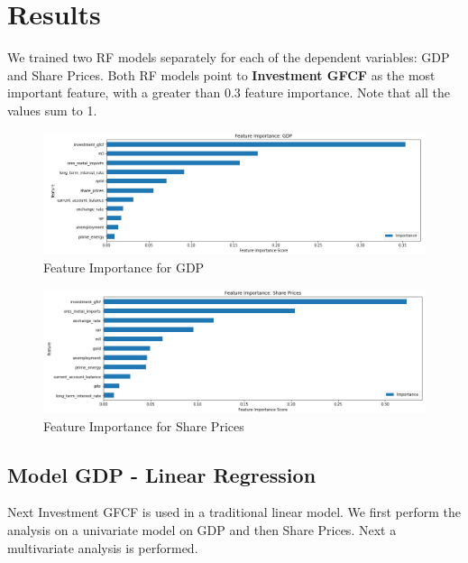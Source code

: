 \documentclass{elsarticle}
\begin{document}

\section{Results}
We trained two RF models separately for each of the dependent variables: GDP and Share Prices. Both RF models point to \textbf{Investment GFCF} as the most important feature, with a greater than 0.3 feature importance. Note that all the values sum to 1.

\begin{figure}[!h]
    \centering
    \includegraphics[width=1\textwidth]{images/rf_gdp.png}
    \caption{Feature Importance for GDP}
    \label{fig:Feature Importance for GDP}
\end{figure}

\begin{figure}[!h]
    \centering
    \includegraphics[width=1\textwidth]{images/rf_shares.png}
    \caption{Feature Importance for Share Prices}
    \label{fig:Feature Importance for Share Prices}
\end{figure}

\subsection{Model GDP - Linear Regression}
Next Investment GFCF is used in a traditional linear model. We first perform the analysis on a univariate model on GDP and then Share Prices. Next a multivariate analysis is performed. 
\end{document}

